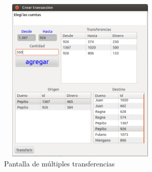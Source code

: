 \begin{description}
		\begin{figure}[h]
			\centering
			\includegraphics[width=300px, height=300px]{img/multTransferencias}
			\caption{Pantalla de múltiples transferencias }
			\label{trasferenciaMultiple}
		\end{figure}
		
\end{description}